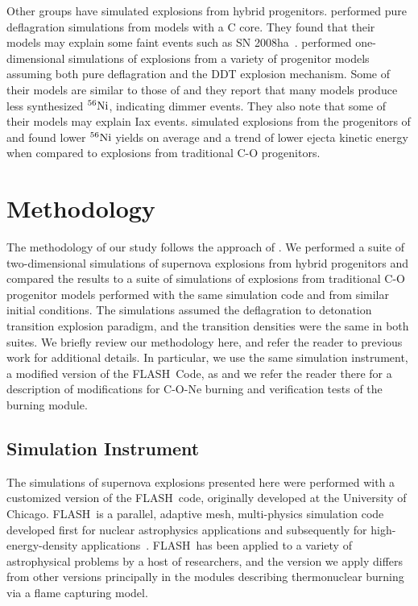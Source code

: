 \documentclass[iop,apj]{emulateapj}
\newcommand{\Ni}[1]{\ensuremath{{}^{#1}{\rm Ni}}}
\newcommand{\code}[1]{\textsc{#1}}
\newcommand{\FLASH}{\code{FLASH}}
\begin{document}
Other groups have simulated explosions from hybrid progenitors.
\citet{kromeretal2015} performed pure deflagration simulations from models
with a C core. They found that their models may explain some faint events
such as SN 2008ha~\citep{foleyetal2009}.
\citet{bravoetal2016} performed one-dimensional simulations of explosions from
a variety of progenitor models assuming both pure deflagration and the DDT
explosion mechanism.
Some of their models are similar to those of \citep{denissenkovetal2015} and
they report that many models produce less synthesized
\Ni{56}, indicating dimmer events. They also note that some of their
models may explain Iax events.
\citet{willcoxetal2016} simulated explosions from the progenitors of
\citet{denissenkovetal2015} and found lower
\Ni{56} yields on average and a trend of lower ejecta kinetic energy
when compared to explosions from traditional C-O progenitors.


\section{Methodology}
\label{sec:method}

The methodology of our study follows the approach of \citet{willcoxetal2016}.
We performed a suite of two-dimensional simulations of supernova explosions
from hybrid progenitors and compared the results to a suite of simulations
of explosions from traditional C-O progenitor models performed with the
same simulation code and from similar initial conditions. The simulations assumed
the deflagration to detonation transition explosion paradigm, and the
transition densities were the same in both suites. We briefly review our methodology
here, and refer the reader to previous work for additional details.
In particular, we use the same simulation instrument, a modified version
of the \FLASH\ Code, as \citet{willcoxetal2016} and we refer the reader there
for a description of modifications for C-O-Ne burning and verification tests
of the burning module.

\subsection{Simulation Instrument}

The simulations of supernova explosions presented here were performed
with a customized version of the \FLASH\ code, originally developed
at the University of Chicago.
\FLASH\ is a parallel, adaptive mesh, multi-physics simulation code
developed first for nuclear astrophysics applications and subsequently
for high-energy-density applications~\citep{Fryxetal00,calder.curtis.ea:high-performance,
calder.fryxell.ea:on,flash_pragmatic,flash_evolution}.
\FLASH\ has been applied to a variety of astrophysical problems by a host
of researchers, and the version we apply differs from other versions
principally in the modules describing thermonuclear burning via a
flame capturing model.
\end{document}
